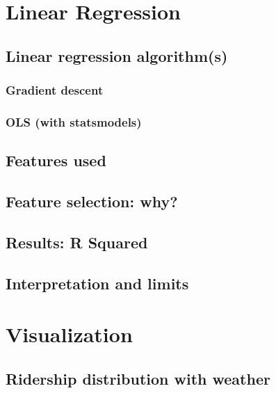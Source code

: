 \documentclass[letterpaper,10pt,english]{sphinxmanual}
\begin{document}
\chapter{Linear Regression}
\label{section2:linear-regression}\label{section2::doc}

\section{Linear regression algorithm(s)}
\label{section2:linear-regression-algorithm-s}

\subsection{Gradient descent}
\label{section2:gradient-descent}

\subsection{OLS (with statsmodels)}
\label{section2:ols-with-statsmodels}

\section{Features used}
\label{section2:features-used}

\section{Feature selection: why?}
\label{section2:feature-selection-why}

\section{Results: R Squared}
\label{section2:results-r-squared}

\section{Interpretation and limits}
\label{section2:interpretation-and-limits}

\chapter{Visualization}
\label{section3:visualization}\label{section3::doc}

\section{Ridership distribution with weather}
\label{section3:ridership-distribution-with-weather}
\end{document}
